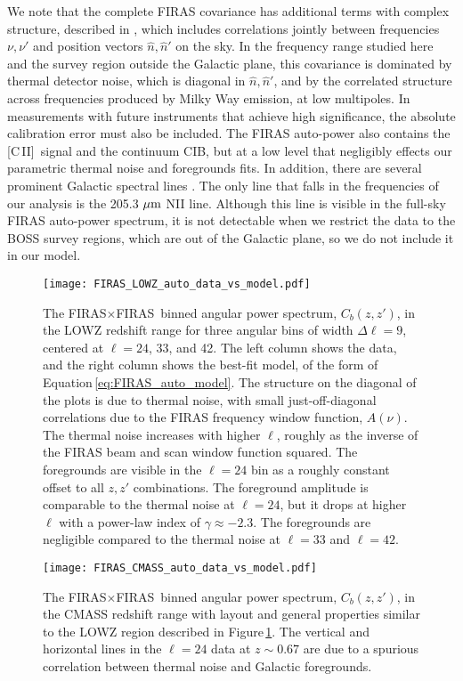 \documentclass[fleqn,usenatbib]{mnras}
\newcommand{\cii}{[C{\sc\,II}]}
\newcommand{\FF}{FIRAS${\times}$FIRAS}
\begin{document}
We note that the complete FIRAS covariance has additional terms with complex structure, described in \cite{FIRASexplanatory}, which includes correlations jointly between frequencies $\nu, \nu'$ and position vectors $\hat n, \hat n'$ on the sky. 
In the frequency range studied here and the survey region outside the Galactic plane, this covariance is dominated by thermal detector noise, which is diagonal in $\hat n, \hat n'$, and by the correlated structure across frequencies produced by Milky Way emission, at low multipoles. In measurements with future instruments that achieve high significance, the absolute calibration error must also be included.
The FIRAS auto-power also contains the \cii\, signal and the continuum CIB, but at a low level that negligibly effects our parametric thermal noise and foregrounds fits. In addition, there are several prominent Galactic spectral lines \citep{fixsen1999cobe}. The only line that falls in the frequencies of our analysis is the 205.3 $\mu {\rm m}$ NII line. Although this line is visible in the full-sky FIRAS auto-power spectrum, it is not detectable when we restrict the data to the BOSS survey regions, which are out of the Galactic plane, so we do not include it in our model. 

\begin{figure}
    \texttt{[image: FIRAS\_LOWZ\_auto\_data\_vs\_model.pdf]}
    \caption{ \label{fig:FIRAS_auto_LOWZ} The \FF\ binned angular power spectrum, $C_{b}(z,z')$, in the LOWZ redshift range for three angular bins of width $\Delta \ell = 9$, centered at  $\ell=24$, 33, and 42. The left column shows the data, and the right column shows the best-fit model, of the form of Equation\,\ref{eq:FIRAS_auto_model}. The structure on the diagonal of the plots is due to thermal noise, with small just-off-diagonal correlations due to the FIRAS frequency window function, $A(\nu)$. The thermal noise increases with higher $\ell$, roughly as the inverse of the FIRAS beam and scan window function squared. The foregrounds are visible in the $\ell=24$ bin as a roughly constant offset to all $z, z'$ combinations. The foreground amplitude is comparable to the thermal noise at $\ell=24$, but it drops at higher $\ell$ with a power-law index of $\gamma \approx -2.3$. The foregrounds are negligible compared to the thermal noise at $\ell=33$ and $\ell=42$. }
\end{figure}

\begin{figure}
    \texttt{[image: FIRAS\_CMASS\_auto\_data\_vs\_model.pdf]}
    \caption{ \label{fig:FIRAS_auto_CMASS} The \FF\ binned angular power spectrum, $C_{b}(z,z')$,  in the CMASS redshift range 
    with layout and general properties similar to the LOWZ region described in Figure\,\ref{fig:FIRAS_auto_LOWZ}.
    The vertical and horizontal lines in the $\ell=24$ data at $z\sim 0.67$ are due to a spurious correlation between thermal noise and Galactic foregrounds. 
    }
\end{figure}
\end{document}
